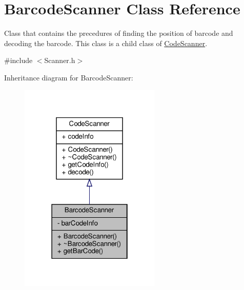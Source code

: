 \hypertarget{class_barcode_scanner}{}\section{Barcode\+Scanner Class Reference}
\label{class_barcode_scanner}


Class that contains the precedures of finding the position of barcode and decoding the barcode. This class is a child class of \hyperlink{class_code_scanner}{Code\+Scanner}.  




{\ttfamily \#include $<$Scanner.\+h$>$}



Inheritance diagram for Barcode\+Scanner\+:\nopagebreak
\begin{figure}[H]
\begin{center}
\leavevmode
\includegraphics[width=190pt]{class_barcode_scanner__inherit__graph}
\end{center}
\end{figure}



